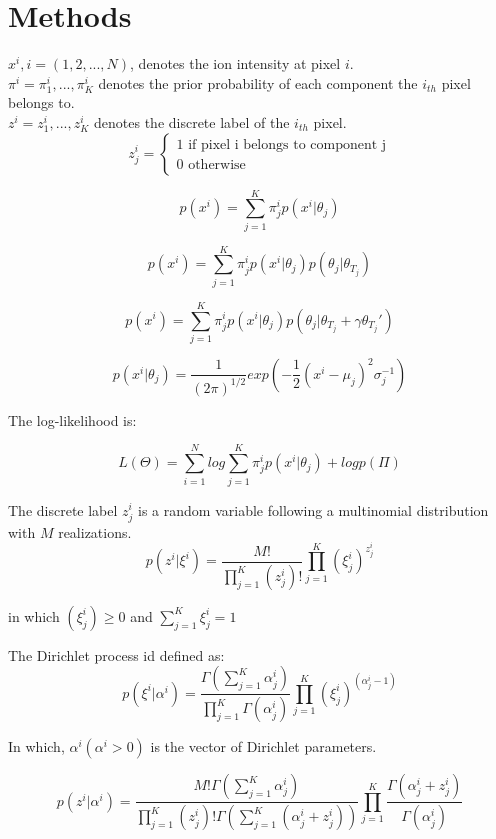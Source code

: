 \documentclass{bioinfo}
\begin{document}
\section{Methods}

$x^i, i = (1,2,...,N)$, denotes the ion intensity at pixel $i$.\\
$\pi^i={\pi^i_1,..., \pi^i_K}$ denotes the prior probability of each component the $i_{th}$ pixel belongs to.\\
$z^i={z^i_1,...,z^i_K}$ denotes the discrete label of the $i_{th}$ pixel.\\
$$z^i_j=\left\{\begin{matrix}
1 \textrm{ if pixel i belongs to component j}\\ 
0 \textrm{ otherwise} 

\end{matrix}\right.$$

$$p(x^i)=\sum_{j=1}^{K}\pi^i_jp(x^i|\theta_j)$$

$$p(x^i)=\sum_{j=1}^{K}\pi^i_jp(x^i|\theta_j)p(\theta_j|\theta_{T_j})$$

$$p(x^i)=\sum_{j=1}^{K}\pi^i_jp(x^i|\theta_j)p(\theta_j|\theta_{T_j}+\gamma \theta_{T_j}')$$

$$p(x^i|\theta_j)=\frac{1}{(2\pi)^{1/2}}exp(-\frac{1}{2}(x^i-\mu_j)^2\sigma_j^{-1})$$

The log-likelihood is:

$$L(\Theta )=\sum_{i=1}^{N}log{\sum_{j=1}^{K}\pi^i_jp(x^i|\theta_j)}+logp(\Pi )$$

The discrete label $z^i_j$ is a random variable following a multinomial distribution with $M$ realizations.\\

$$p(z^i|\xi ^i)=\frac{M!}{\prod_{j=1}^{K}(z^i_j)!}\prod_{j=1}^{K}(\xi ^i_j)^{z^i_j}$$

in which $(\xi ^i_j)\ge0$ and $\sum_{j=1}^{K}\xi ^i_j=1$

The Dirichlet process id defined as:\\

$$p(\xi ^i|\alpha^i)=\frac{\Gamma (\sum_{j=1}^{K}\alpha^i_j)}{\prod_{j=1}^{K}\Gamma (\alpha^i_j)}\prod_{j=1}^{K}(\xi^i_j)^{(\alpha^i_j-1)}$$

In which, $\alpha^i (\alpha^i>0)$ is the vector of Dirichlet parameters.

$$p(z^i|\alpha^i)=\frac{M!\Gamma (\sum_{j=1}^{K}\alpha^i_j)}{\prod_{j=1}^{K}(z^i_j)!\Gamma (\sum_{j=1}^{K}(\alpha^i_j+z^i_j))}\prod_{j=1}^{K}{\frac{\Gamma(\alpha^i_j+z^i_j)}{\Gamma(\alpha^i_j)}}$$
\end{document}
